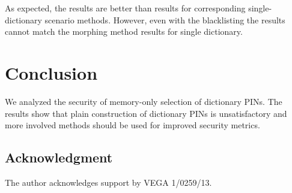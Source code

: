 \documentclass[a4paper, 11pt]{article}
\begin{document}
{As expected, the results are better than results for corresponding single-dictionary scenario methods. 
However, even with the blacklisting the results cannot match the morphing method results for single
dictionary.


\section{Conclusion}

We analyzed the security of memory-only selection of dictionary PINs. The results show that
plain construction of dictionary PINs is unsatisfactory and more involved methods should be used for 
improved security metrics.

\subsection*{Acknowledgment} The author acknowledges support by VEGA 1/0259/13. 


}
\end{document}
